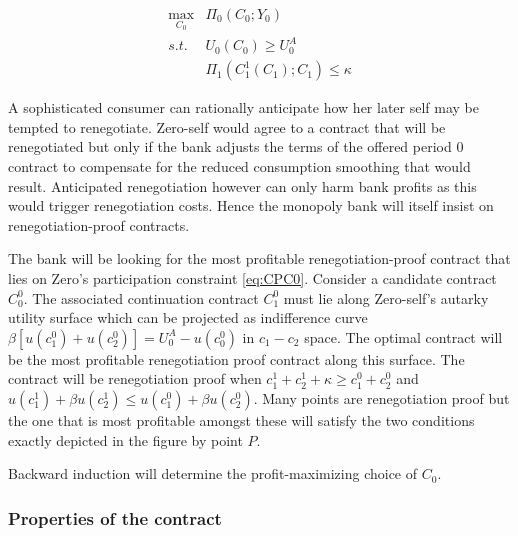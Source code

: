 \documentclass[11pt,english]{article}
\theoremstyle{plain}
\theoremstyle{definition}
\begin{document}
\begin{align}
\max_{C_{0}} & \Pi_{0}\left(C_{0};Y_{0}\right)\\
s.t. & U_{0}\left(C_{0}\right)\geq U_{0}^{A}\\
 & \Pi_{1}\left(C_{1}^{1}\left(C_{1}\right);C_{1}\right)\leq\kappa\label{eq:rpc-m}
\end{align}

A sophisticated consumer can rationally anticipate how her later self
may be tempted to renegotiate. Zero-self would agree to a contract
that will be renegotiated but only if the bank adjusts the terms of
the offered period 0 contract to compensate for the reduced consumption
smoothing that would result. Anticipated renegotiation however can
only harm bank profits as this would trigger renegotiation costs.
Hence the monopoly bank will itself insist on renegotiation-proof
contracts.

The bank will be looking for the most profitable renegotiation-proof
contract that lies on Zero's participation constraint \ref{eq:CPC0}.
Consider a candidate contract $C_{0}^{0}$. The associated continuation
contract $C_{1}^{0}$ must lie along Zero-self's autarky utility surface
which can be projected as indifference curve 
$\beta\left[u(c_{1}^{0})+u(c_{2}^{0})\right]=U_{0}^{A}-u(c_{0}^{0})$
in $c_{1}-c_{2}$ space. The optimal contract will be the most profitable
renegotiation proof contract along this surface. The contract will
be renegotiation proof when $c_{1}^{1}+c_{2}^{1}+\kappa\ge c_{1}^{0}+c_{2}^{0}$
and $u(c_{1}^{1})+\beta u(c_{2}^{1})\le u(c_{1}^{0})+\beta u(c_{2}^{0})$.
Many points are renegotiation proof but the one that is most profitable
amongst these will satisfy the two conditions exactly depicted in
the figure by point $P$.

Backward induction will determine the profit-maximizing choice
of $C_{0}$.

\subsubsection{Properties of the contract}
\end{document}
